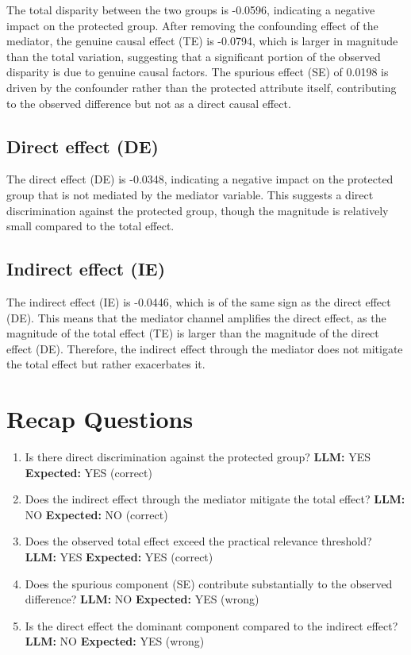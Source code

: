 \documentclass[11pt]{article}
\begin{document}
The total disparity between the two groups is -0.0596, indicating a negative impact on the protected group. After removing the confounding effect of the mediator, the genuine causal effect (TE) is -0.0794, which is larger in magnitude than the total variation, suggesting that a significant portion of the observed disparity is due to genuine causal factors. The spurious effect (SE) of 0.0198 is driven by the confounder rather than the protected attribute itself, contributing to the observed difference but not as a direct causal effect.

\subsection{Direct effect (DE)}

The direct effect (DE) is -0.0348, indicating a negative impact on the protected group that is not mediated by the mediator variable. This suggests a direct discrimination against the protected group, though the magnitude is relatively small compared to the total effect.

\subsection{Indirect effect (IE)}

The indirect effect (IE) is -0.0446, which is of the same sign as the direct effect (DE). This means that the mediator channel amplifies the direct effect, as the magnitude of the total effect (TE) is larger than the magnitude of the direct effect (DE). Therefore, the indirect effect through the mediator does not mitigate the total effect but rather exacerbates it.

\section{Recap Questions}

\begin{enumerate}
\item Is there direct discrimination against the protected group? \textbf{LLM:} YES \quad \textbf{Expected:} YES \quad (correct)
\item Does the indirect effect through the mediator mitigate the total effect? \textbf{LLM:} NO \quad \textbf{Expected:} NO \quad (correct)
\item Does the observed total effect exceed the practical relevance threshold? \textbf{LLM:} YES \quad \textbf{Expected:} YES \quad (correct)
\item Does the spurious component (SE) contribute substantially to the observed difference? \textbf{LLM:} NO \quad \textbf{Expected:} YES \quad (wrong)
\item Is the direct effect the dominant component compared to the indirect effect? \textbf{LLM:} NO \quad \textbf{Expected:} YES \quad (wrong)
\end{enumerate}
\end{document}
